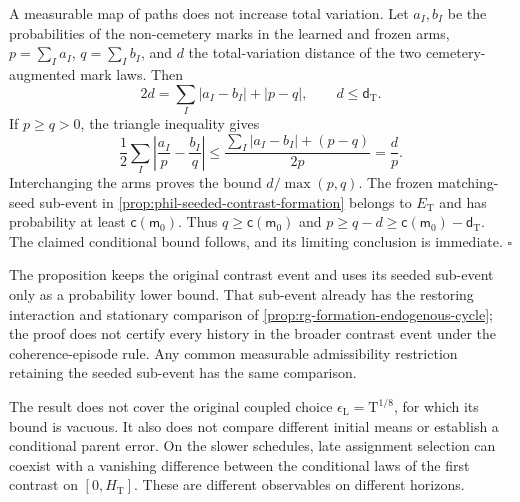 A measurable map of paths does not increase total variation. Let
\(a_I,b_I\) be the probabilities of the non-cemetery marks in the learned
and frozen arms, \(p=\sum_Ia_I\), \(q=\sum_Ib_I\), and \(d\) the
total-variation distance of the two cemetery-augmented mark laws. Then
\[
 2d=\sum_I|a_I-b_I|+|p-q|,
 \qquad d\le\mathsf d_{\mathrm T}.
\]
If \(p\ge q>0\), the triangle inequality gives
\[
 \frac12\sum_I\left|\frac{a_I}{p}-\frac{b_I}{q}\right|
 \le\frac{\sum_I|a_I-b_I|+(p-q)}{2p}
 =\frac d p.
\]
Interchanging the arms proves the bound \(d/\max(p,q)\).
The frozen matching-seed sub-event in
\cref{prop:phil-seeded-contrast-formation} belongs to \(E_{\mathrm T}\)
and has probability at least \(\mathsf c(\mathsf m_0)\).
Thus \(q\ge\mathsf c(\mathsf m_0)\) and
\(p\ge q-d\ge\mathsf c(\mathsf m_0)-\mathsf d_{\mathrm T}\).
The claimed conditional bound follows, and its limiting conclusion is
immediate. \(\square\)

The proposition keeps the original contrast event and uses its seeded
sub-event only as a probability lower bound. That sub-event already has
the restoring interaction and stationary comparison of
\cref{prop:rg-formation-endogenous-cycle}; the proof does not certify
every history in the broader contrast event under the coherence-episode
rule. Any common measurable admissibility restriction retaining the
seeded sub-event has the same comparison.

The result does not cover the original coupled choice
\(\epsilon_{\mathrm L}=\mathrm T^{1/8}\), for which its bound is
vacuous. It also does not compare different initial means or establish a
conditional parent error. On the slower schedules, late assignment
selection can coexist with a vanishing difference between the conditional
laws of the first contrast on \([0,H_{\mathrm T}]\). These are
different observables on different horizons.


